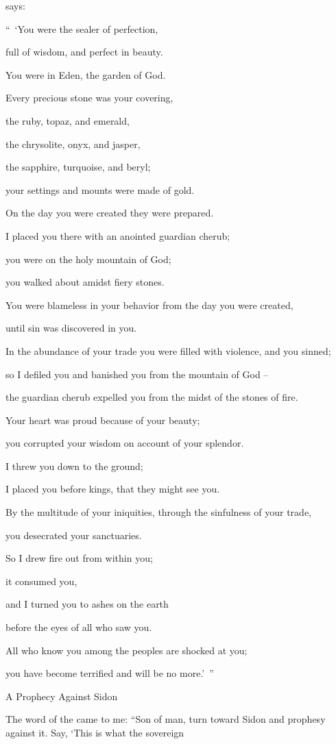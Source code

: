 {{}
says:
\par }{\Q “ ‘You
were the sealer
of perfection,
\par }{\Q full
of wisdom,
and perfect
in beauty.
\par }{\Q {}You were in Eden,
the garden
of God.
\par }{\Q Every
precious
stone
was your covering,
\par }{\Q the ruby,
topaz,
and emerald,
\par }{\Q the chrysolite,
onyx,
and jasper,
\par }{\Q the sapphire,
turquoise,
and beryl;
\par }{\Q your settings
and mounts
were made
of gold.
\par }{\Q On the day
you were created
they were prepared.
\par }{\Q {}I placed you
there with an anointed
guardian
cherub;
\par }{\Q you were on the holy
mountain
of God;
\par }{\Q you walked about
amidst
fiery
stones.
\par }{\Q {}You were blameless
in your behavior
from the day
you were created,
\par }{\Q until
sin
was discovered in you.
\par }{\Q {}In the abundance
of your trade
you were filled
with violence,
and you sinned;
\par }{\Q so I defiled
you and banished
you from the mountain
of God
–
\par }{\Q the guardian cherub
expelled
you from the midst
of the stones
of fire.
\par }{\Q {}Your heart
was proud
because of your beauty;
\par }{\Q you corrupted
your wisdom
on
account of your splendor.
\par }{\Q I threw
you down to the ground;
\par }{\Q I placed you before
kings,
that they might see you.
\par }{\Q {}By
the multitude
of your iniquities,
through the sinfulness
of your trade,
\par }{\Q you desecrated
your sanctuaries.
\par }{\Q So I drew
fire
out from within
you;
\par }{\Q it consumed
you,
\par }{\Q and I
turned you
to ashes
on
the earth
\par }{\Q before the eyes
of all
who saw you.
\par }{\Q {}All
who know
you among the peoples
are shocked
at you;
\par }{\Q you have become terrified
and will be no
more.’ ”
\par }{\SH A Prophecy Against Sidon
\par }{\PP {}The word
of the {}
came to me:
“Son
of man,
turn
toward
Sidon
and prophesy
against it.
Say,
‘This is what
the sovereign

}
